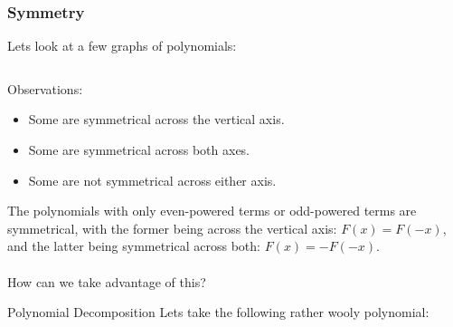 \documentclass{beamer}
\begin{document}
\begin{frame}
  \frametitle{Symmetry}
  Lets look at a few graphs of polynomials:

  \begin{columns}
  \end{columns}
\end{frame}

\begin{frame}
  \begin{columns}
  \end{columns}
\end{frame}

\begin{frame}
  \begin{columns}
  \end{columns}
\end{frame}

\begin{frame}
  Observations:
  \begin{itemize}
    \item Some are symmetrical across the vertical axis.
    \item Some are symmetrical across both axes.
    \item Some are not symmetrical across either axis.
  \end{itemize}

  The polynomials with only even-powered terms or odd-powered terms are symmetrical, with the former being across the vertical axis: $F(x) = F(-x)$, and the latter being symmetrical across both: $F(x) = -F(-x)$.\\~\\

  How can we take advantage of this?

\end{frame}

\begin{frame}{Polynomial Decomposition}
  Lets take the following rather wooly polynomial:
\end{frame}
\end{document}
